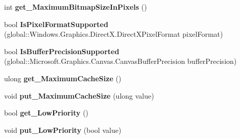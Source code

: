 \begin{DoxyCompactItemize}
\item 
\mbox{\label{interface_microsoft_1_1_graphics_1_1_canvas_1_1_i_canvas_device_a898fb605ef7e1454030d832f6091f198}} 
int {\bfseries get\+\_\+\+Maximum\+Bitmap\+Size\+In\+Pixels} ()
\item 
\mbox{\label{interface_microsoft_1_1_graphics_1_1_canvas_1_1_i_canvas_device_a1bbc8a4c7b32d66babc6a466f3947580}} 
bool {\bfseries Is\+Pixel\+Format\+Supported} (global\+::\+Windows.\+Graphics.\+Direct\+X.\+Direct\+X\+Pixel\+Format pixel\+Format)
\item 
\mbox{\label{interface_microsoft_1_1_graphics_1_1_canvas_1_1_i_canvas_device_acfa5f7ea5e23895e632195b070bb4023}} 
bool {\bfseries Is\+Buffer\+Precision\+Supported} (global\+::\+Microsoft.\+Graphics.\+Canvas.\+Canvas\+Buffer\+Precision buffer\+Precision)
\item 
\mbox{\label{interface_microsoft_1_1_graphics_1_1_canvas_1_1_i_canvas_device_a4004fcfc71e1035a4e3e56590d32a11a}} 
ulong {\bfseries get\+\_\+\+Maximum\+Cache\+Size} ()
\item 
\mbox{\label{interface_microsoft_1_1_graphics_1_1_canvas_1_1_i_canvas_device_a3812c813e00bdc30b376b38962b40ba7}} 
void {\bfseries put\+\_\+\+Maximum\+Cache\+Size} (ulong value)
\item 
\mbox{\label{interface_microsoft_1_1_graphics_1_1_canvas_1_1_i_canvas_device_a8e974c9c2295757c25f1c270c662d0df}} 
bool {\bfseries get\+\_\+\+Low\+Priority} ()
\item 
\mbox{\label{interface_microsoft_1_1_graphics_1_1_canvas_1_1_i_canvas_device_a82a3e875104020e0b8e886b72df60554}} 
void {\bfseries put\+\_\+\+Low\+Priority} (bool value)
\item 
\mbox{\label{interface_microsoft_1_1_graphics_1_1_canvas_1_1_i_canvas_device_a883498a6511789a253e054e8db8972ac}} 

\end{DoxyCompactItemize}
